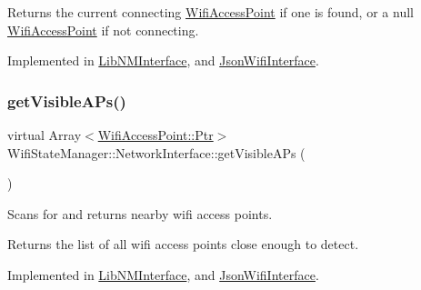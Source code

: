 \begin{DoxyReturn}{Returns}
the current connecting \mbox{\hyperlink{classWifiAccessPoint}{Wifi\+Access\+Point}} if one is found, or a null \mbox{\hyperlink{classWifiAccessPoint}{Wifi\+Access\+Point}} if not connecting. 
\end{DoxyReturn}


Implemented in \mbox{\hyperlink{classLibNMInterface_a79b0bb8661be490b6cbb68abfdc93152}{Lib\+N\+M\+Interface}}, and \mbox{\hyperlink{classJsonWifiInterface_a16cf46edd6f175f1217f6b341651b18d}{Json\+Wifi\+Interface}}.

\mbox{\label{classWifiStateManager_1_1NetworkInterface_a898004009e9645ad96a777ca2ee6a245}} 
\subsubsection{\texorpdfstring{get\+Visible\+A\+Ps()}{getVisibleAPs()}}
{\footnotesize\ttfamily virtual Array$<$\mbox{\hyperlink{classWifiAccessPoint_ad18977f884076774803027efbaa131a0}{Wifi\+Access\+Point\+::\+Ptr}}$>$ Wifi\+State\+Manager\+::\+Network\+Interface\+::get\+Visible\+A\+Ps (\begin{DoxyParamCaption}{ }\end{DoxyParamCaption})\hspace{0.3cm}{\ttfamily [pure virtual]}}

Scans for and returns nearby wifi access points.

\begin{DoxyReturn}{Returns}
the list of all wifi access points close enough to detect. 
\end{DoxyReturn}


Implemented in \mbox{\hyperlink{classLibNMInterface_a52834cf27d1d7ea06939695c9caebca1}{Lib\+N\+M\+Interface}}, and \mbox{\hyperlink{classJsonWifiInterface_aaf538e8120fad2c6a861de5ef9c01543}{Json\+Wifi\+Interface}}.

\mbox{\label{classWifiStateManager_1_1NetworkInterface_a15bec43de60c0e31694b28d2362c894f}} 
